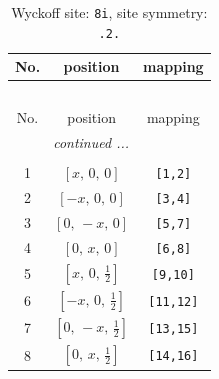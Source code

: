 \documentclass[fleqn,8pt]{jsarticle}
\begin{document}
\renewcommand{\arraystretch}{1.2}
\begin{longtable}{ccc}
\caption{Wyckoff site: {\tt 8i}, site symmetry: {\tt .2.}}
 \\
 \hline \hline
No. & position & mapping \\ \hline \endfirsthead

\multicolumn{2}{l}{\tablename\ \thetable{}} \\
 \hline \hline
No. & position & mapping \\ \hline \endhead

 \hline \hline
\multicolumn{2}{r}{\footnotesize\it continued ...} \\ \endfoot

 \hline \hline
\multicolumn{2}{r}{} \\ \endlastfoot

1 & $\left[ x,\, 0,\, 0 \right]$ & {\tt [1,2]} \\ \hline
2 & $\left[ - x,\, 0,\, 0 \right]$ & {\tt [3,4]} \\ \hline
3 & $\left[ 0,\, - x,\, 0 \right]$ & {\tt [5,7]} \\ \hline
4 & $\left[ 0,\, x,\, 0 \right]$ & {\tt [6,8]} \\ \hline
5 & $\left[ x,\, 0,\, \frac{1}{2} \right]$ & {\tt [9,10]} \\ \hline
6 & $\left[ - x,\, 0,\, \frac{1}{2} \right]$ & {\tt [11,12]} \\ \hline
7 & $\left[ 0,\, - x,\, \frac{1}{2} \right]$ & {\tt [13,15]} \\ \hline
8 & $\left[ 0,\, x,\, \frac{1}{2} \right]$ & {\tt [14,16]} \\
\end{longtable}
\renewcommand{\arraystretch}{1.2}
\end{document}
